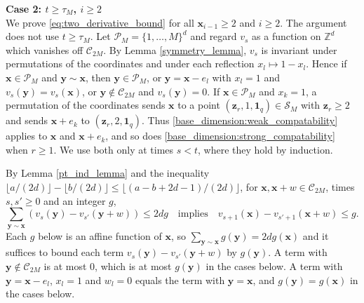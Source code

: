 \documentclass[12pt]{amsart}
\newcommand{\Z}{\mathbb{Z}}
\begin{document}
{\bf Case 2: $t \geq \tau_M$, $i \geq 2$} \\
We prove \eqref{eq:two_derivative_bound} for all $\mathbf{x}_{i-1} \geq 2$ and $i \geq 2$. The argument does not use $t \geq \tau_M$.
Let $\mathcal{P}_M = \{1, \ldots, M\}^d$ and regard $v_s$ as a function on $\Z^d$ which vanishes off $\mathcal{C}_{2M}$.
By Lemma \ref{symmetry_lemma}, $v_s$ is invariant under permutations of the coordinates and under each reflection $x_l \mapsto 1 - x_l$.
Hence if $\mathbf{x} \in \mathcal{P}_M$ and $\mathbf{y} \sim \mathbf{x}$, then $\mathbf{y} \in \mathcal{P}_M$,
or $\mathbf{y} = \mathbf{x} - e_l$ with $x_l = 1$ and $v_s(\mathbf{y}) = v_s(\mathbf{x})$, or $\mathbf{y} \not \in \mathcal{C}_{2M}$ and $v_s(\mathbf{y}) = 0$.
If $\mathbf{x} \in \mathcal{P}_M$ and $x_k = 1$, a permutation of the coordinates sends $\mathbf{x}$ to a point $(\mathbf{z}_r, 1, \mathbf{1}_q) \in \mathcal{S}_M$ with $\mathbf{z}_r \geq 2$
and sends $\mathbf{x} + e_k$ to $(\mathbf{z}_r, 2, \mathbf{1}_q)$.
Thus \eqref{base_dimension:weak_compatability} applies to $\mathbf{x}$ and $\mathbf{x} + e_k$, and so does \eqref{base_dimension:strong_compatability} when $r \geq 1$.
We use both only at times $s < t$, where they hold by induction.

By Lemma \ref{pt_ind_lemma} and the inequality $\lfloor a/(2d) \rfloor - \lfloor b/(2d) \rfloor \leq \lfloor (a - b + 2d - 1)/(2d) \rfloor$,
for $\mathbf{x}, \mathbf{x} + w \in \mathcal{C}_{2M}$, times $s, s' \geq 0$ and an integer $g$,
\begin{equation} \label{eq:floor_step}
\sum_{\mathbf{y} \sim \mathbf{x}} \left( v_{s}(\mathbf{y}) - v_{s'}(\mathbf{y} + w) \right) \leq 2 d g
\quad \mbox{implies} \quad
v_{s+1}(\mathbf{x}) - v_{s'+1}(\mathbf{x} + w) \leq g.
\end{equation}
Each $g$ below is an affine function of $\mathbf{x}$, so $\sum_{\mathbf{y} \sim \mathbf{x}} g(\mathbf{y}) = 2 d g(\mathbf{x})$
and it suffices to bound each term $v_{s}(\mathbf{y}) - v_{s'}(\mathbf{y} + w)$ by $g(\mathbf{y})$.
A term with $\mathbf{y} \not \in \mathcal{C}_{2M}$ is at most $0$, which is at most $g(\mathbf{y})$ in the cases below.
A term with $\mathbf{y} = \mathbf{x} - e_l$, $x_l = 1$ and $w_l = 0$ equals the term with $\mathbf{y} = \mathbf{x}$, and $g(\mathbf{y}) = g(\mathbf{x})$ in the cases below.
\end{document}
